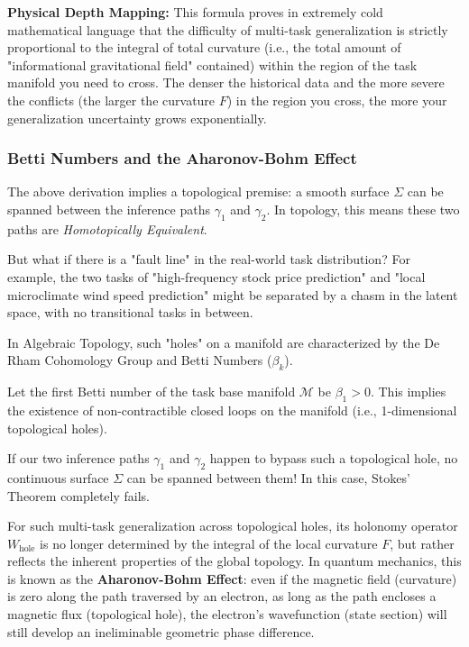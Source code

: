\documentclass{article}
\begin{document}
\noindent\textbf{Physical Depth Mapping:} This formula proves in extremely cold mathematical language that the difficulty of multi-task generalization is strictly proportional to the integral of total curvature (i.e., the total amount of "informational gravitational field" contained) within the region of the task manifold you need to cross. The denser the historical data and the more severe the conflicts (the larger the curvature $F$) in the region you cross, the more your generalization uncertainty grows exponentially.

\subsubsection{Betti Numbers and the Aharonov-Bohm Effect}

The above derivation implies a topological premise: a smooth surface $\Sigma$ can be spanned between the inference paths $\gamma_1$ and $\gamma_2$. In topology, this means these two paths are \textit{Homotopically Equivalent}.

But what if there is a "fault line" in the real-world task distribution? For example, the two tasks of "high-frequency stock price prediction" and "local microclimate wind speed prediction" might be separated by a chasm in the latent space, with no transitional tasks in between.

In Algebraic Topology, such "holes" on a manifold are characterized by the De Rham Cohomology Group and Betti Numbers ($\beta_k$).

Let the first Betti number of the task base manifold $\mathcal{M}$ be $\beta_1 > 0$. This implies the existence of non-contractible closed loops on the manifold (i.e., 1-dimensional topological holes).

If our two inference paths $\gamma_1$ and $\gamma_2$ happen to bypass such a topological hole, no continuous surface $\Sigma$ can be spanned between them! In this case, Stokes' Theorem completely fails.

For such multi-task generalization across topological holes, its holonomy operator $W_{\text{hole}}$ is no longer determined by the integral of the local curvature $F$, but rather reflects the inherent properties of the global topology. In quantum mechanics, this is known as the \textbf{Aharonov-Bohm Effect}: even if the magnetic field (curvature) is zero along the path traversed by an electron, as long as the path encloses a magnetic flux (topological hole), the electron's wavefunction (state section) will still develop an ineliminable geometric phase difference.
\end{document}
